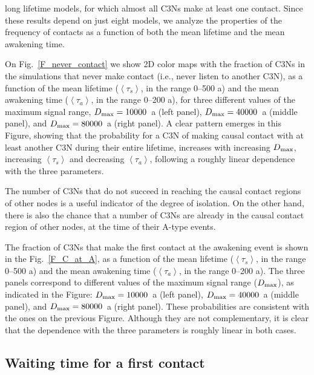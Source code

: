\documentclass[crop]{CSLB}
\newcommand{\ceti}{C3N}
\newcommand{\cetis}{C3Ns}
\newcommand{\ffn}[1]{}
\begin{document}
long lifetime models, for which almost all \cetis{} make at least one
contact.
%
Since these results depend on just eight models, we analyze the
properties of the frequency of contacts as a function of both the mean
lifetime and the mean awakening time.
%
\ffn{4}
%
On Fig.~\ref{F_never_contact} we show 2D color maps with the fraction
of \cetis{} in the simulations that never make contact (i.e., never
listen to another \ceti{}), as a function of the mean lifetime
($\left<\tau_s\right>$, in the range 0--500 a) and the mean awakening
time ($\left<\tau_a\right>$, in the range 0--200 a), for three
different values of the maximum signal range, $D_{\rm max}=10000$~a (left
panel), $D_{\rm max}=40000$~a (middle panel), and $D_{\rm
max}=80000$~a
(right panel).
%
A clear pattern emerges in this Figure, showing that the probability
for a \ceti{} of making causal contact with at least another \ceti{}
during their entire lifetime, increases with increasing $D_{\rm max}$,
increasing $\left<\tau_s\right>$ and decreasing $\left<\tau_a\right>$,
following a roughly linear dependence with the three parameters.


The number of \cetis{} that do not succeed in reaching the
causal contact regions of other nodes is a useful indicator of
the
degree of isolation.
%
On the other hand, there is also the chance that a number of
\cetis{} are already in the causal contact region of other nodes,
at the time of their A-type events.
%
\ffn{5}
%
The fraction of \cetis{} that make the first contact at the awakening
event is shown in the Fig.~\ref{F_C_at_A}, 
as a function of the mean lifetime
($\left<\tau_s\right>$, in the range 0--500 a) and the mean awakening
time ($\left<\tau_a\right>$, in the range 0--200 a).
%
The three panels correspond to different values of the maximum signal
range ($D_{\rm max}$),
as indicated in the Figure:
%
$D_{\rm max}=10000$~a (left
panel), $D_{\rm max}=40000$~a (middle panel), and $D_{\rm
max}=80000$~a
(right panel).
%
These probabilities are consistent with the ones on the previous
Figure.
%
Although they are not complementary, it is clear that the dependence
with the three parameters is roughly linear in both cases.
%


%


\subsection{Waiting time for a first contact}\label{SS_waiting}
\end{document}
